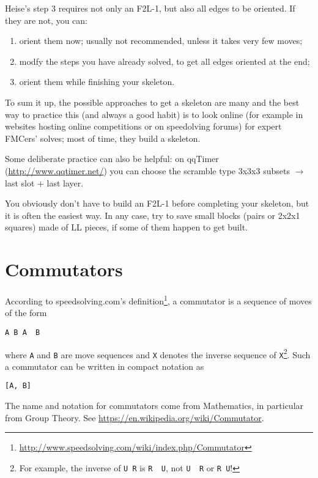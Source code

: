 \documentclass[11pt,a4paper]{book}
\newcommand{\p}{\textquotesingle}
\newcommand{\m}{\texttt}
\newcommand{\ps}{\p\,\,}
\begin{document}
Heise's step 3 requires not only an F2L-1, but also all edges to be oriented. If they are not, you can:
\begin{enumerate}
\item orient them now; usually not recommended, unless it takes very few moves;
\item modfy the steps you have already solved, to get all edges oriented at the end;
\item orient them while finishing your skeleton.
\end{enumerate}

To sum it up, the possible approaches to get a skeleton are many and the best way to practice this (and always a good habit) is to look online (for example in websites hosting online competitions or on speedolving forums) for expert FMCers' solves; most of time, they build a skeleton.

Some deliberate practice can also be helpful: on qqTimer (\url{http://www.qqtimer.net/}) you can choose the scramble type 3x3x3 subsets $\rightarrow$ last slot + last layer.

You obviously don't have to build an F2L-1 before completing your skeleton, but it is often the easiest way. In any case, try to save small blocks (pairs or 2x2x1 squares) made of LL pieces, if some of them happen to get built.

\section{Commutators}

According to speedsolving.com's definition\footnote{\url{http://www.speedsolving.com/wiki/index.php/Commutator}}, a commutator is a sequence of moves of the form

\begin{center}
\m{A B A\ps B\p}
\end{center}

where \m A and \m B are move sequences and \m{X\p} denotes the inverse sequence of \m X\footnote{For example, the inverse of \m{U R} is \m{R\ps U\p}, not \m{U\ps R\p} or \m{R U}!}. Such a commutator can be written in compact notation as

\begin{center}
\m{[A, B]}
\end{center}

The name and notation for commutators come from Mathematics, in particular from Group Theory. See \url{https://en.wikipedia.org/wiki/Commutator}.
\end{document}
